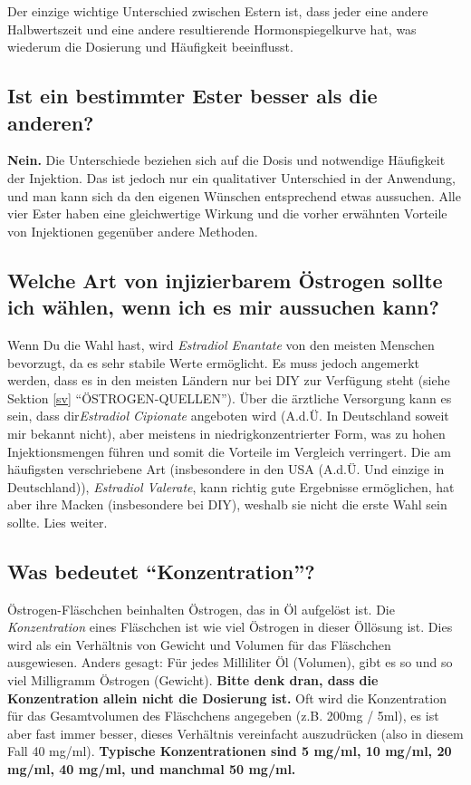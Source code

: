 \documentclass{article}
\begin{document}
{Der einzige wichtige Unterschied zwischen Estern ist, dass jeder eine andere Halbwertszeit und eine andere resultierende Hormonspiegelkurve hat, was wiederum die Dosierung und Häufigkeit beeinflusst.

\subsection{Ist ein bestimmter Ester besser als die anderen?}

\textbf{Nein.} Die Unterschiede beziehen sich auf die Dosis und notwendige Häufigkeit der Injektion. Das ist jedoch nur ein qualitativer Unterschied in der Anwendung, und man kann sich da den eigenen Wünschen entsprechend etwas aussuchen. Alle vier Ester haben eine gleichwertige Wirkung und die vorher erwähnten Vorteile von Injektionen gegenüber andere Methoden. 

\subsection{Welche Art von injizierbarem Östrogen sollte ich wählen, wenn ich es mir aussuchen kann?}

Wenn Du die Wahl hast, wird \textit{Estradiol Enantate} von den meisten Menschen bevorzugt, da es sehr stabile Werte ermöglicht. Es muss jedoch angemerkt werden, dass es in den meisten Ländern nur bei DIY zur Verfügung steht (siehe Sektion \ref{sv} “ÖSTROGEN-QUELLEN”). Über die ärztliche Versorgung kann es sein, dass dir\textit{Estradiol Cipionate} angeboten wird (A.d.Ü. In Deutschland soweit mir bekannt nicht), aber meistens in niedrigkonzentrierter Form, was zu hohen Injektionsmengen führen und somit die Vorteile im Vergleich verringert. Die am häufigsten verschriebene Art (insbesondere in den USA (A.d.Ü. Und einzige in Deutschland)), \textit{Estradiol Valerate}, kann richtig gute Ergebnisse ermöglichen, hat aber ihre Macken (insbesondere bei DIY), weshalb sie nicht die erste Wahl sein sollte. Lies weiter.

\subsection{Was bedeutet “Konzentration”?}

Östrogen-Fläschchen beinhalten Östrogen, das in Öl aufgelöst ist. Die \textit{Konzentration} eines Fläschchen ist wie viel Östrogen in dieser Öllösung ist. Dies wird als ein Verhältnis von Gewicht und Volumen für das Fläschchen ausgewiesen. Anders gesagt: Für jedes Milliliter Öl (Volumen), gibt es so und so viel Milligramm Östrogen (Gewicht). \textbf{Bitte denk dran, dass die Konzentration allein nicht die Dosierung ist.} Oft wird die Konzentration für das Gesamtvolumen des Fläschchens angegeben (z.B. 200mg / 5ml), es ist aber fast immer besser, dieses Verhältnis vereinfacht auszudrücken (also in diesem Fall 40 mg/ml). \textbf{Typische Konzentrationen sind 5 mg/ml, 10 mg/ml, 20 mg/ml, 40 mg/ml, und manchmal 50 mg/ml.}

}
\end{document}
